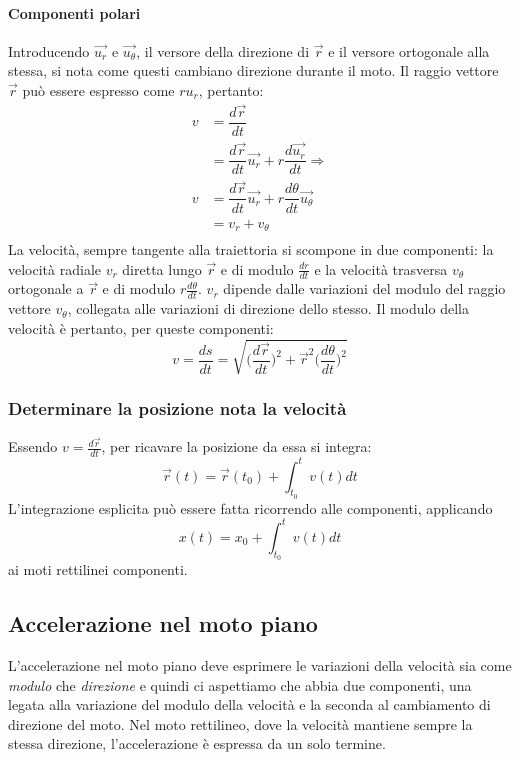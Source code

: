 \documentclass[class=book, crop=false, oneside, 12pt]{standalone}
\begin{document}
			\paragraph{Componenti polari}
      Introducendo $\overrightarrow{u_r}$ e $\overrightarrow{u_\theta}$, il versore della direzione di $\overrightarrow{r}$ e il versore ortogonale alla stessa, si nota come questi cambiano direzione durante il moto.
      Il raggio vettore $\overrightarrow{r}$ pu\`o essere espresso come $ru_r$, pertanto:
			\begin{align*}
        v&=\dfrac{d\overrightarrow{r}}{dt}\\
         &=\dfrac{d\overrightarrow{r}}{dt}\overrightarrow{u_r}+r\dfrac{d\overrightarrow{u_r}}{dt}\Rightarrow\\
        v&=\dfrac{d\overrightarrow{r}}{dt}\overrightarrow{u_r}+r\dfrac{d\theta}{dt}\overrightarrow{u_\theta}\\
				 &=v_r+v_\theta\\
			\end{align*}
      La velocit\`a, sempre tangente alla traiettoria si scompone in due componenti: la velocit\`a radiale $v_r$ diretta lungo $\overrightarrow{r}$ e di modulo $\frac{dr}{dt}$ e la velocit\`a trasversa $v_\theta$ ortogonale a $\overrightarrow{r}$ e di modulo $r\frac{d\theta}{dt}$.
			$v_r$ dipende dalle variazioni del modulo del raggio vettore $v_\theta$, collegata alle variazioni di direzione dello stesso.
			Il modulo della velocit\`a \`e pertanto, per queste componenti:
      $$v=\dfrac{ds}{dt}=\sqrt{\biggl(\dfrac{d\overrightarrow{r}}{dt}\biggr)^2+\overrightarrow{r}^2\biggl(\dfrac{d\theta}{dt}\biggr)^2}$$
		\subsubsection{Determinare la posizione nota la velocit\`a}
    Essendo $v=\frac{d\overrightarrow{r}}{dt}$, per ricavare la posizione da essa si integra:
    $$\overrightarrow{r}(t)=\overrightarrow{r}(t_0)+\int_{t_0}^tv(t)dt$$
		L'integrazione esplicita pu\`o essere fatta ricorrendo alle componenti, applicando
		$$x(t)=x_0+\int_{t_0}^tv(t)dt$$
		ai moti rettilinei componenti.
  \subsection{Accelerazione nel moto piano}
  L'accelerazione nel moto piano deve esprimere le variazioni della velocità sia come \emph{modulo} che \emph{direzione} e quindi ci aspettiamo che abbia due componenti,
  una legata alla variazione del modulo della velocità e la seconda al cambiamento di direzione del moto.
  Nel moto rettilineo, dove la velocità mantiene sempre la stessa direzione, l'accelerazione è espressa da un solo termine.
\end{document}
